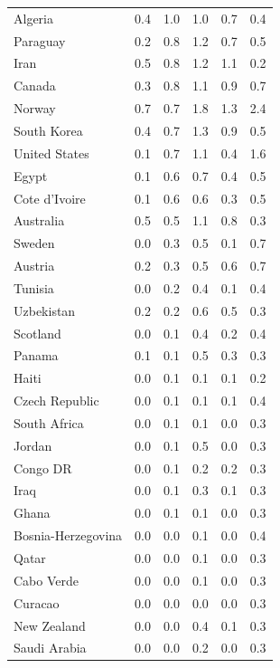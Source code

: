 \documentclass{article}
\begin{document}
\begin{table}[p]
\begin{tabular}{lrrrrr}
Algeria & 0.4 & 1.0 & 1.0 & 0.7 & 0.4 \\
Paraguay & 0.2 & 0.8 & 1.2 & 0.7 & 0.5 \\
Iran & 0.5 & 0.8 & 1.2 & 1.1 & 0.2 \\
Canada & 0.3 & 0.8 & 1.1 & 0.9 & 0.7 \\
Norway & 0.7 & 0.7 & 1.8 & 1.3 & 2.4 \\
South Korea & 0.4 & 0.7 & 1.3 & 0.9 & 0.5 \\
United States & 0.1 & 0.7 & 1.1 & 0.4 & 1.6 \\
Egypt & 0.1 & 0.6 & 0.7 & 0.4 & 0.5 \\
Cote d'Ivoire & 0.1 & 0.6 & 0.6 & 0.3 & 0.5 \\
Australia & 0.5 & 0.5 & 1.1 & 0.8 & 0.3 \\
Sweden & 0.0 & 0.3 & 0.5 & 0.1 & 0.7 \\
Austria & 0.2 & 0.3 & 0.5 & 0.6 & 0.7 \\
Tunisia & 0.0 & 0.2 & 0.4 & 0.1 & 0.4 \\
Uzbekistan & 0.2 & 0.2 & 0.6 & 0.5 & 0.3 \\
Scotland & 0.0 & 0.1 & 0.4 & 0.2 & 0.4 \\
Panama & 0.1 & 0.1 & 0.5 & 0.3 & 0.3 \\
Haiti & 0.0 & 0.1 & 0.1 & 0.1 & 0.2 \\
Czech Republic & 0.0 & 0.1 & 0.1 & 0.1 & 0.4 \\
South Africa & 0.0 & 0.1 & 0.1 & 0.0 & 0.3 \\
Jordan & 0.0 & 0.1 & 0.5 & 0.0 & 0.3 \\
Congo DR & 0.0 & 0.1 & 0.2 & 0.2 & 0.3 \\
Iraq & 0.0 & 0.1 & 0.3 & 0.1 & 0.3 \\
Ghana & 0.0 & 0.1 & 0.1 & 0.0 & 0.3 \\
Bosnia-Herzegovina & 0.0 & 0.0 & 0.1 & 0.0 & 0.4 \\
Qatar & 0.0 & 0.0 & 0.1 & 0.0 & 0.3 \\
Cabo Verde & 0.0 & 0.0 & 0.1 & 0.0 & 0.3 \\
Curacao & 0.0 & 0.0 & 0.0 & 0.0 & 0.3 \\
New Zealand & 0.0 & 0.0 & 0.4 & 0.1 & 0.3 \\
Saudi Arabia & 0.0 & 0.0 & 0.2 & 0.0 & 0.3 \\
\bottomrule
\end{tabular}
\end{table}
\end{document}
